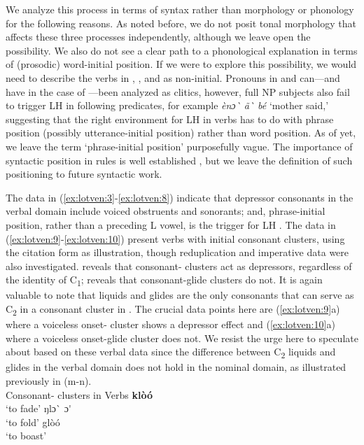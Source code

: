 \documentclass[output=paper
,newtxmath
,modfonts
,nonflat]{langsci/langscibook}
\begin{document}
We analyze this process in terms of syntax rather than morphology or phonology for the following reasons. As noted before, we do not posit tonal morphology that affects these three processes independently, although we leave open the possibility. We also do not see a clear path to a phonological explanation in terms of (prosodic) word-initial position. If we were to explore this possibility, we would need to describe the verbs in , , and  as non-initial. Pronouns in  and  can—and have in the case of  \citep{Duthie1996}—been analyzed as clitics, however, full NP subjects also fail to trigger LH  in following predicates, for example \textit{ènɔ\`{} ã\`{}  bé} ‘mother said,’ suggesting that the right environment for LH  in verbs has to do with phrase position (possibly utterance-initial position) rather than word position. As of yet, we leave the term ‘phrase-initial position’ purposefully vague. The importance of syntactic position in  rules is well established \citep{Snider2014}, but we leave the definition of such positioning to future syntactic work.

The data in (\ref{ex:lotven:3}-\ref{ex:lotven:8}) indicate that depressor consonants in the verbal domain include voiced obstruents and sonorants; and, phrase-initial position, rather than a preceding L  vowel, is the trigger for LH . The data in (\ref{ex:lotven:9}-\ref{ex:lotven:10}) present verbs with initial consonant clusters, using the citation form as illustration, though reduplication and imperative data were also investigated.  reveals that consonant- clusters act as depressors, regardless of the identity of C\textsubscript{1};  reveals that consonant-glide clusters do not. It is again valuable to note that liquids and glides are the only consonants that can serve as C\textsubscript{2} in a consonant cluster in . The crucial data points here are (\ref{ex:lotven:9}a) where a voiceless onset- cluster shows a depressor effect and (\ref{ex:lotven:10}a) where a voiceless onset-glide cluster does not. We resist the urge here to speculate about  based on these verbal data since the difference between C\textsubscript{2} liquids and glides in the verbal domain does not hold in the nominal domain, as illustrated previously in  (m-n).
\\
\ea\label{ex:lotven:9}Consonant- clusters in  Verbs
\ea\label{ex:lotven:9a}
    \textbf{klòó}\\
    \glt ‘to fade’
\ex\label{ex:lotven:9b}
	ŋlɔ\`{} ɔ\'{}\\
    \glt ‘to fold’
\ex\label{ex:lotven:9c}
	glòó\\
    \glt ‘to boast’
\z
\z
\end{document}
